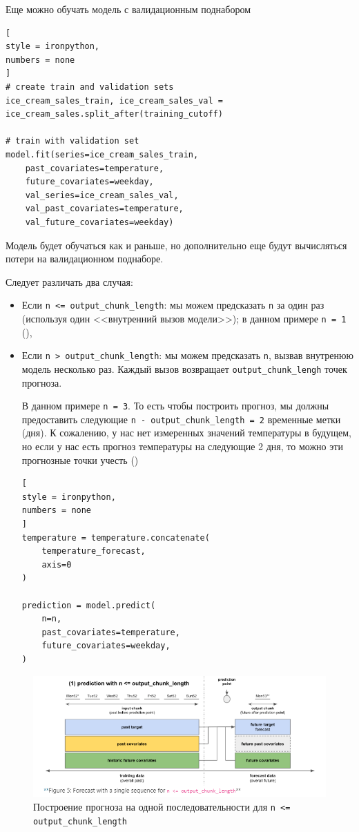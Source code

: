 \documentclass[%
	11pt,
	a4paper,
	utf8,
		]{article}
\begin{document}
Еще можно обучать модель с валидационным поднабором
\begin{lstlisting}[
style = ironpython,
numbers = none
]
# create train and validation sets
ice_cream_sales_train, ice_cream_sales_val = ice_cream_sales.split_after(training_cutoff)

# train with validation set
model.fit(series=ice_cream_sales_train,
	past_covariates=temperature,
	future_covariates=weekday,
	val_series=ice_cream_sales_val,
	val_past_covariates=temperature,
	val_future_covariates=weekday)
\end{lstlisting}

Модель будет обучаться как и раньше, но дополнительно еще будут вычисляться потери на валидационном поднаборе.

Следует различать два случая:
\begin{itemize}
	\item Если \verb|n <= output_chunk_length|: мы можем предсказать \verb|n| за один раз (используя один <<внутренний вызов модели>>); в данном примере \verb|n = 1| (),
	
	\item Если \verb|n > output_chunk_length|: мы можем предсказать \verb|n|, вызвав внутренюю модель несколько раз. Каждый вызов возвращает \verb|output_chunk_lengh| точек прогноза.
	
	В данном примере \verb|n = 3|. То есть чтобы построить прогноз, мы должны предоставить следующие \verb|n - output_chunk_length = 2| временные метки (дня). К сожалению, у нас нет измеренных значений температуры в будущем, но если у нас есть прогноз температуры на следующие 2 дня, то можно эти прогнозные точки учесть ()
\begin{lstlisting}[
style = ironpython,
numbers = none
]
temperature = temperature.concatenate(
    temperature_forecast,
    axis=0
)

prediction = model.predict(
    n=n,
    past_covariates=temperature,
    future_covariates=weekday,
)
\end{lstlisting}
\end{itemize}

\begin{figure}[h]
	\centering
	\includegraphics[scale=0.9 ]{figures/n_lt_output.png}
	\caption{ Построение прогноза на одной последовательности для \texttt{n <= output\_chunk\_length} }\label{fig:n_lt_output}
\end{figure}
\end{document}
